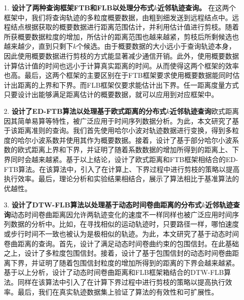\begin{itemize}
	\item[1.] \textbf{设计了两种查询框架FTB和FLB以处理分布式$k$近邻轨迹查询。}
	在这两个框架中，我们将查询轨迹的多粒度概要数据，由粗到细发送到远程结点中。远程结点根据获取的概要数据进行距离范围估计，并利用估计值进行剪枝。随着所获概要数据粒度的增加，所估计的距离范围也越来越紧，剪枝后所剩候选也越来越少，直到只剩下$k$个候选。由于概要数据的大小远小于查询轨迹本身，因此使用概要数据进行剪枝的方式能显著减少通信开销。此外，使用概要数据计算估计值的时间也远小于计算真实距离的时间。从而使得这两个框架的效率也高。最后，这两个框架的主要区别在于FTB框架要求使用概要数据能同时估计出距离的上界和下界。而FLB框架仅要求能估计出下界。任一距离度量方式只要设计出能够满足距离估计的概要数据，就可以应用到对应框架中。
	
	\item[2.] \textbf{设计了ED-FTB算法以处理基于欧式距离的分布式$k$近邻轨迹查询}欧式距离因其简单易算等特性，被广泛应用于时间序列数据分析。为此，本文研究了基于该距离准则的查询。我们首先使用哈尔小波对轨迹数据进行变换，得到多粒度的哈尔小波系数并使用其作为概要数据。接着，设计了基于部分哈尔小波系数的欧式距离上界和下界，并证明了随着系数数据的增加所得到的距离上、下界同时会越来越紧。基于以上结论，设计了欧式距离和FTB框架相结合的ED-FTB算法。在该算法中，引入了在计算上、下界过程中进行剪枝的策略以提高执行效率。最后，理论分析和实验结果相结合，展示了算法相比于基准算法的优越性。
	
	\item[3.] \textbf{设计了DTW-FLB算法以处理基于动态时间卷曲距离的分布式$k$近邻轨迹查询}动态时间卷曲距离因允许两轨迹变化的速度不一样同样也被广泛应用时间序列数据的分析中。比如，在寻找相似的运动轨迹时，只要路径一样，哪怕速度或步行时间不一致也被认为是极相似的轨迹。为此，本文研究了基于动态时间卷曲距离的查询。首先，设计了满足动态时间卷曲约束的包围信封。在此基础之上，设计了多粒度包围信封。接着，设计了基于包围信封的动态时间卷曲距离下界，并证明了随着包围信封粒度的增加所得到的距离的下界会越来越紧。基于以上分析，设计了动态时间卷曲距离和FLB框架箱结合的DTW-FLB算法。同样在该算法中引入了在计算下界过程中进行剪枝的策略以提高执行效率。最后，我们在真实轨迹数据集上验证了算法的有效性和可扩展性。
\end{itemize}
\hspace{-0.5cm}
 
